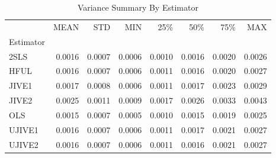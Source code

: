 \begin{table}[ht]
\centering
\caption{Variance Summary By Estimator}
\begin{tabular}{lrrrrrrr}
\toprule
 & MEAN & STD & MIN & 25\% & 50\% & 75\% & MAX \\
Estimator &  &  &  &  &  &  &  \\
\midrule
2SLS & 0.0016 & 0.0007 & 0.0006 & 0.0010 & 0.0016 & 0.0020 & 0.0026 \\
HFUL & 0.0016 & 0.0007 & 0.0006 & 0.0011 & 0.0016 & 0.0020 & 0.0027 \\
JIVE1 & 0.0017 & 0.0008 & 0.0006 & 0.0011 & 0.0017 & 0.0023 & 0.0029 \\
JIVE2 & 0.0025 & 0.0011 & 0.0009 & 0.0017 & 0.0026 & 0.0033 & 0.0043 \\
OLS & 0.0015 & 0.0007 & 0.0005 & 0.0010 & 0.0015 & 0.0019 & 0.0025 \\
UJIVE1 & 0.0016 & 0.0007 & 0.0006 & 0.0011 & 0.0017 & 0.0021 & 0.0027 \\
UJIVE2 & 0.0016 & 0.0007 & 0.0006 & 0.0011 & 0.0016 & 0.0021 & 0.0027 \\
\bottomrule
\end{tabular}
\end{table}
